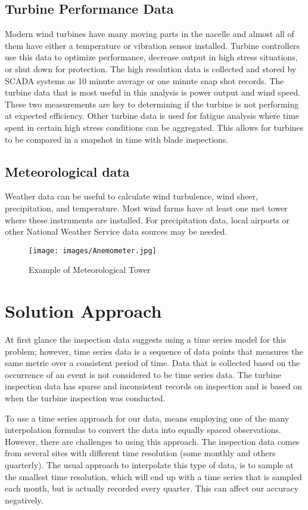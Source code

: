 \documentclass[runningheads]{llncs}
\begin{document}
\subsection{Turbine Performance Data}
Modern wind turbines have many moving parts in the nacelle and almost all of them have either a temperature or vibration sensor installed. Turbine controllers use this data to optimize performance, decrease output in high stress situations, or shut down for protection. The high resolution data is collected and stored by SCADA systems as 10 minute average or one minute snap shot records. 
The turbine data that is most useful in this analysis is power output and wind speed. These two measurements are key to determining if the turbine is not performing at expected efficiency. Other turbine data is used for fatigue analysis where time spent in certain high stress conditions can be aggregated. This allows for turbines to be compared in a snapshot in time with blade inspections. 

\subsection{Meteorological data}
Weather data can be useful to calculate wind turbulence, wind sheer, precipitation, and temperature. Most wind farms have at least one met tower where these instruments are installed. For precipitation data, local airports or other National Weather Service data sources may be needed. 

\begin{figure}[H]
    \centering
    \texttt{[image: images/Anemometer.jpg]}
    \caption{Example of Meteorological Tower}
    \label{fig:metTower}
\end{figure}

\section{Solution Approach} 
At first glance the inspection data suggests using a time series model for this problem; however, time series data is a sequence of data points that measures the same metric over a consistent period of time. Data that is collected based on the occurrence of an event is not considered to be time series data. The turbine inspection data has sparse and inconsistent records on inspection and is based on when the turbine inspection was conducted.

To use a time series approach for our data, means employing one of the many interpolation formulas to convert the data into equally spaced observations. However, there are challenges to using this approach. The inspection data comes from several sites with different time resolution (some monthly and others quarterly). The usual approach to interpolate this type of data, is to sample at the smallest time resolution, which will end up with a time series that is sampled each month, but is actually recorded every quarter. This can affect our accuracy negatively.
\end{document}
